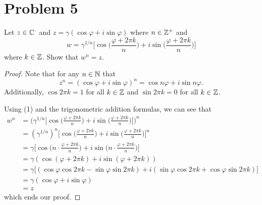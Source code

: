 \documentclass[a4paper]{article}
\begin{document}
    \section*{Problem 5} Let \( z \in \mathbb{C}^{\cdot} \) and \( z = \gamma ( \cos \varphi + i \sin \varphi)\) where \( n \in \mathbb{Z}^{+}  \) and  
        \[  w = \gamma^{1/n} \Bigg[ \cos \Big(  \frac{ \varphi + 2 \pi k  }{ n  } \Big)  + i \sin \Big(  \frac{ \varphi + 2 \pi k  }{ n  }  \Big)\Bigg]  \]
        where \( k \in \mathbb{Z}  \). Show that \( w^{n} = z  \).
        \begin{proof}
        Note that for any \( n \in \mathbb{N}  \) that 
        \[ z^{n} = ( \cos \varphi + i \sin \varphi )^{n} = \cos n \varphi + i \sin n \varphi.   \tag{1}  \]
        Additionally, \( \cos 2 \pi k  = 1  \) for all \( k \in \mathbb{Z}  \) and \( \sin 2 \pi k  = 0  \) for all \( k \in \mathbb{Z}  \).

        Using (1) and the trigonometric addition formulas, we can see that 
        \begin{align*}
            w^{n} &= \Bigg(  \gamma^{1/n} \Bigg[  \cos \Bigg(  \frac{ \varphi + 2 \pi k  }{ n  } \Big)  + i \sin \Big(  \frac{ \varphi + 2 \pi k  }{ n  }  \Big) \Bigg] \Bigg)^{n} \\
                  &= (\gamma^{1/n})^{n} \Bigg[ \cos \Big(  \frac{ \varphi + 2 \pi k  }{ n  } \Big)  + i \sin \Big(  \frac{ \varphi + 2 \pi k  }{ n  }  \Big) \Bigg]^{n} \\
                  &= \gamma \Bigg[ \cos \Big( n \cdot  \frac{ \varphi + 2 \pi k  }{ n }  \Big) + i \sin \Big(  n \cdot \frac{  \varphi + 2 \pi k  }{ n  }  \Big) \Bigg] \\   
                  &= \gamma (\cos (\varphi + 2 \pi k ) + i \sin (\varphi + 2 \pi k )) \\
                  &=  \gamma \Big[ (\cos \varphi \cos 2 \pi k  - \sin \varphi \sin 2 \pi k  ) + i( \sin \varphi \cos 2 \pi k  + \cos \varphi \sin 2 \pi  k ) \Big]  \\
                  &= \gamma (\cos \varphi + i \sin \varphi) \\ 
                  &= z
        \end{align*}
        which ends our proof.
        \end{proof}
\end{document}
